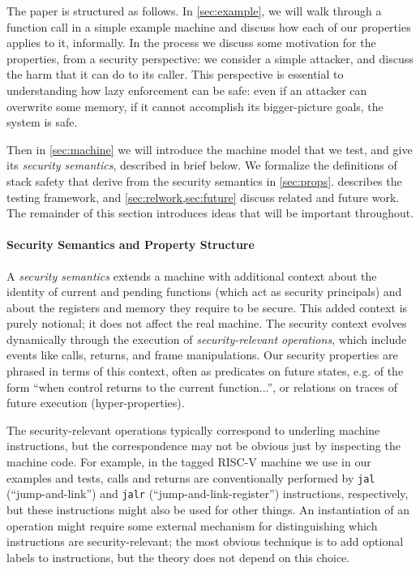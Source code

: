 The paper is structured as follows. In \cref{sec:example}, we will walk through a function
call in a simple example machine and discuss how each of our properties applies to it,
informally. In the process we discuss some motivation for the properties, from a security
perspective: we consider a simple attacker, and discuss the harm that it can do to
its caller. This perspective is essential to understanding how lazy enforcement can
be safe: even if an attacker can overwrite some memory, if it cannot accomplish
its bigger-picture goals, the system is safe.

Then in \cref{sec:machine} we will introduce the machine model that we test, and give
its {\em security semantics}, described in brief below. We formalize the definitions of
stack safety that derive from the security semantics in \cref{sec:props}.
 describes the testing framework, and
\cref{sec:relwork,sec:future} discuss related and future work.
The remainder of this section introduces ideas that will be important throughout.

\paragraph*{Security Semantics and Property Structure}

A {\it security semantics} extends a machine
with additional context about the identity of current and pending
functions (which act as security principals) and about the registers and memory they require
to be secure. This added context is purely notional;
it does not affect the real machine. The security context
evolves dynamically through the execution of {\it security-relevant operations},
which include events like calls, returns, and frame manipulations.
Our security properties are phrased in terms of this context, often as predicates
on future states, e.g. of the form ``when control returns to the current function...'',
or relations on traces of future execution (hyper-properties).

The security-relevant operations typically correspond to underling machine instructions,
but the correspondence may not be obvious just by inspecting the machine code.
For example, in the tagged RISC-V machine we use in our examples and tests,
calls and returns are conventionally performed by {\tt jal} (``jump-and-link'')
and {\tt jalr} (``jump-and-link-register'') instructions, respectively, but these
instructions might also be used for other things. An instantiation of an operation
might require some external mechanism for distinguishing which instructions are
security-relevant; the most obvious technique is to add optional labels to instructions,
but the theory does not depend on this choice.

